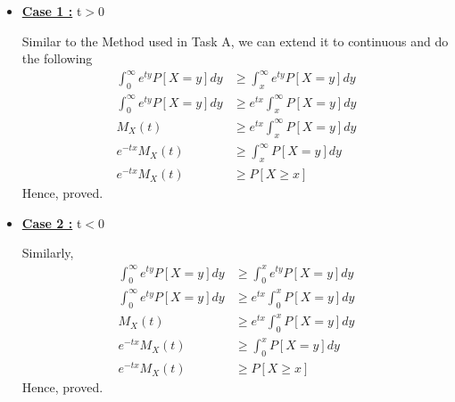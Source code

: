 \documentclass[12pt]{article}
\begin{document}
\begin{itemize}
    \item \underline{\textbf{Case 1 :}} t$>$0

Similar to the Method used in Task A, we can extend it to continuous and do the following
\begin{equation}
\begin{split}
    \int_0^\infty e^{ty}P[X=y]dy& \geq \int_x^\infty e^{ty}P[X=y]dy \\
    \int_0^\infty e^{ty}P[X=y]dy& \geq e^{tx}\int_x^\infty P[X=y]dy \\
    M_X(t)& \geq e^{tx}\int_x^\infty P[X=y]dy \\
    e^{-tx}M_X(t)& \geq \int_x^\infty P[X=y]dy \\
    e^{-tx}M_X(t)& \geq P[X\geq x]
\end{split}
\end{equation}
Hence, proved.
    \item \underline{\textbf{Case 2 :}} t$<$0

Similarly,
\begin{equation}
\begin{split}
    \int_0^\infty e^{ty}P[X=y]dy& \geq \int_0^x e^{ty}P[X=y]dy \\
    \int_0^\infty e^{ty}P[X=y]dy& \geq e^{tx}\int_0^x P[X=y]dy \\
    M_X(t)& \geq e^{tx}\int_0^x P[X=y]dy \\
    e^{-tx}M_X(t)& \geq \int_0^x P[X=y]dy \\
    e^{-tx}M_X(t)& \geq P[X\geq x]
\end{split}
\end{equation}
Hence, proved.
\end{itemize}
\end{document}
